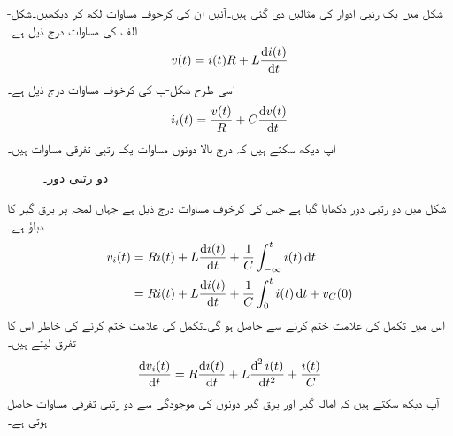 شکل  میں یک رتبی ادوار کی مثالیں دی گئی ہیں۔آئیں ان کی کرخوف مساوات لکھ کر دیکھیں۔شکل-الف کی مساوات درج ذیل ہے۔
\begin{align}
v(t)=i(t)R+L \frac{\dif i(t)}{\dif t}
\end{align}
اسی طرح شکل-ب کی کرخوف مساوات درج ذیل ہے۔
\begin{align}
i_i(t)=\frac{v(t)}{R}+C\frac{\dif v(t)}{\dif t}
\end{align}
آپ دیکھ سکتے ہیں کہ درج بالا دونوں مساوات یک رتبی تفرقی مساوات ہیں۔

\begin{figure}
\centering
{}
\caption{دو رتبی دور۔}
\label{شکل_عارضی_دور_درجی_دور_الف}
\end{figure}

شکل  میں دو رتبی دور دکھایا گیا ہے جس کی کرخوف مساوات درج ذیل ہے جہاں  لمحہ  پر برق گیر کا دباؤ ہے۔
\begin{gather}
\begin{aligned}\label{مساوات_عارضی_تکمل_و_تفرقی_الف}
v_i(t)&=R i(t)+L\frac{\dif i(t)}{\dif t}+\frac{1}{C} \int_{-\infty}^{t}i(t) \dif t\\
&=R i(t)+L\frac{\dif i(t)}{\dif t}+\frac{1}{C} \int_{0}^{t}i(t) \dif t+v_C(0)
\end{aligned}
\end{gather}
اس  میں تکمل کی علامت ختم کرنے سے  حاصل ہو گی۔تکمل کی علامت ختم کرنے کی خاطر اس کا تفرق لیتے ہیں۔
\begin{align}
\frac{\dif v_i(t)}{\dif t}=R \frac{\dif i(t)}{\dif t}+L\frac{\dif^{\,2} i(t)}{\dif t^2}+\frac{i(t)}{C}
\end{align} 
آپ دیکھ سکتے ہیں کہ امالہ گیر اور برق گیر دونوں کی موجودگی سے دو رتبی تفرقی مساوات حاصل ہوتی ہے۔

